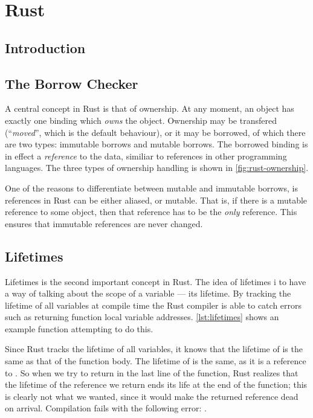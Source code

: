 \chapter{Rust\label{ch:rust}}


\section{Introduction}
\lorem{}



\section{The Borrow Checker\label{sec:borrow-checker}}

A central concept in Rust is that of ownership. At any moment, an object has exactly one binding
which \emph{owns} the object. Ownership may be transfered (``\emph{moved}'', which is the default
behaviour), or it may be borrowed, of which there are two types: immutable borrows and mutable
borrows. The borrowed binding is in effect a \emph{reference} to the data, similiar to references
in other programming languages. The three types of ownership handling is shown in
\cref{fig:rust-ownership}.



One of the reasons to differentiate between mutable and immutable borrows, is references in Rust
can be either aliased, or mutable. That is, if there is a mutable reference to some object, then
that reference has to be the \emph{only} reference. This ensures that immutable references are
never changed.



\section{Lifetimes\label{sec:rust-lifetimes}}

Lifetimes is the second important concept in Rust. The idea of lifetimes i to have a way of talking
about the scope of a variable --- its lifetime. By tracking the lifetime of all variables at
compile time the Rust compiler is able to catch errors such as returning function local variable
addresses. \cref{lst:lifetimes} shows an example function attempting to do this.

Since Rust tracks the lifetime of all variables, it knows that the lifetime of  is the
same as that of the function body. The lifetime of  is the same, as it is a reference to
. So when we try to return  in the last line of the function, Rust realizes that
the lifetime of the reference we return ends its life at the end of the function; this is clearly
not what we wanted, since it would make the returned reference dead on arrival. Compilation fails
with the following error: .

